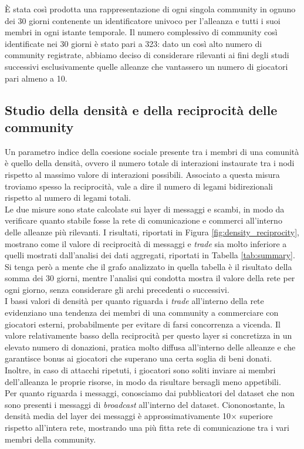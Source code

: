 È stata così prodotta una rappresentazione di ogni singola community in ognuno dei 30 giorni contenente un identificatore univoco per l'alleanza e tutti i suoi membri in ogni istante temporale. Il numero complessivo di community così identificate nei 30 giorni è stato pari a 323: dato un così alto numero di community registrate, abbiamo deciso di considerare rilevanti ai fini degli studi successivi esclusivamente quelle alleanze che vantassero un numero di giocatori pari almeno a 10.

\subsection{Studio della densità e della reciprocità delle community}
\label{sec:density}
Un parametro indice della coesione sociale presente tra i membri di una comunità è quello della densità, ovvero il numero totale di interazioni instaurate tra i nodi rispetto al massimo valore di interazioni possibili. Associato a questa misura troviamo spesso la reciprocità, vale a dire il numero di legami bidirezionali rispetto al numero di legami totali. \\
Le due misure sono state calcolate sui layer di messaggi e scambi, in modo da verificare quanto stabile fosse la rete di comunicazione e commerci all'interno delle alleanze più rilevanti.
I risultati, riportati in Figura \ref{fig:density_reciprocity}, mostrano come il valore di reciprocità di messaggi e \textit{trade} sia molto inferiore a quelli mostrati dall'analisi dei dati aggregati, riportati in Tabella \ref{tab:summary}. Si tenga però a mente che il grafo analizzato in quella tabella è il risultato della somma dei 30 giorni, mentre l'analisi qui condotta mostra il valore della rete per ogni giorno, senza considerare gli archi precedenti o successivi.\\
I bassi valori di densità per quanto riguarda i \textit{trade} all'interno della rete evidenziano una tendenza dei membri di una community a commerciare con giocatori esterni, probabilmente per evitare di farsi concorrenza a vicenda. Il valore relativamente basso della reciprocità per questo layer si concretizza in un elevato numero di donazioni, pratica molto diffusa all'interno delle alleanze e che garantisce bonus ai giocatori che superano una certa soglia di beni donati. Inoltre, in caso di attacchi ripetuti, i giocatori sono soliti inviare ai membri dell'alleanza le proprie risorse, in modo da risultare bersagli meno appetibili.\\
Per quanto riguarda i messaggi, conosciamo dai pubblicatori del dataset che non sono presenti i messaggi di \textit{broadcast} all'interno del dataset.  Ciononostante, la densità media del layer dei messaggi è approssimativamente 10$\times$ superiore rispetto all'intera rete, mostrando una più fitta rete di comunicazione tra i vari membri della community.\\
